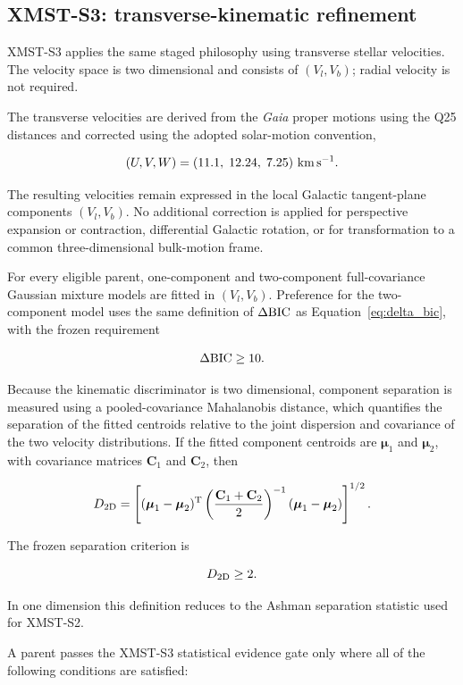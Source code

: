 \documentclass[fleqn,usenatbib]{rasti}
\begin{document}
\subsection{XMST-S3: transverse-kinematic refinement}
\label{sec:s3_method}

XMST-S3 applies the same staged philosophy using transverse stellar
velocities. The velocity space is two dimensional and consists of
$(V_l,V_b)$; radial velocity is not required.

The transverse velocities are derived from the \textit{Gaia} proper motions
using the Q25 distances and corrected using the adopted solar-motion
convention,

\[
(U,V,W)
=
(11.1,\;12.24,\;7.25)
~{\rm km\,s^{-1}}.
\]

The resulting velocities remain expressed in the local Galactic
tangent-plane components $(V_l,V_b)$. No additional correction is
applied for perspective expansion or contraction, differential Galactic
rotation, or for transformation to a common three-dimensional bulk-motion
frame.


For every eligible parent, one-component and two-component full-covariance
Gaussian mixture models are fitted in $(V_l,V_b)$. Preference for the
two-component model uses the same definition of $\Delta{\rm BIC}$ as
Equation~\ref{eq:delta_bic}, with the frozen requirement

\[
\Delta{\rm BIC}\geq10.
\]

Because the kinematic discriminator is two dimensional, component separation
is measured using a pooled-covariance Mahalanobis distance, which quantifies
the separation of the fitted centroids relative to the joint dispersion and
covariance of the two velocity distributions. If the fitted component
centroids are $\boldsymbol{\mu}_1$ and $\boldsymbol{\mu}_2$, with covariance
matrices $\mathbf{C}_1$ and $\mathbf{C}_2$, then

\begin{equation}
D_{\rm 2D}
=
\left[
(\boldsymbol{\mu}_1-\boldsymbol{\mu}_2)^{\rm T}
\left(
\frac{\mathbf{C}_1+\mathbf{C}_2}{2}
\right)^{-1}
(\boldsymbol{\mu}_1-\boldsymbol{\mu}_2)
\right]^{1/2}.
\label{eq:d2d}
\end{equation}

The frozen separation criterion is

\[
D_{\rm 2D}\geq2.
\]

In one dimension this definition reduces to the Ashman separation statistic
used for XMST-S2.

A parent passes the XMST-S3 statistical evidence gate only where all of the
following conditions are satisfied:
\end{document}
